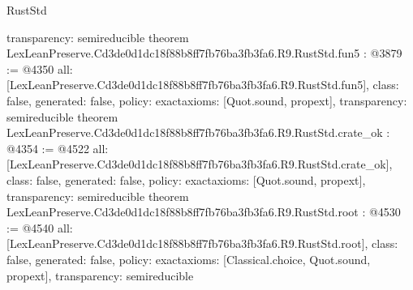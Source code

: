 \begin{lexlean}{RustStd}
\begin{coremodule}
{  transparency: semireducible
}
theorem LexLeanPreserve.Cd3de0d1dc18f88b8ff7fb76ba3fb3fa6.R9.RustStd.fun5 : @3879 := @4350 {
  all: [LexLeanPreserve.Cd3de0d1dc18f88b8ff7fb76ba3fb3fa6.R9.RustStd.fun5],
  class: false,
  generated: false,
  policy: exact{axioms: [Quot.sound, propext]},
  transparency: semireducible
}
theorem LexLeanPreserve.Cd3de0d1dc18f88b8ff7fb76ba3fb3fa6.R9.RustStd.crate_ok : @4354 := @4522 {
  all: [LexLeanPreserve.Cd3de0d1dc18f88b8ff7fb76ba3fb3fa6.R9.RustStd.crate_ok],
  class: false,
  generated: false,
  policy: exact{axioms: [Quot.sound, propext]},
  transparency: semireducible
}
theorem LexLeanPreserve.Cd3de0d1dc18f88b8ff7fb76ba3fb3fa6.R9.RustStd.root : @4530 := @4540 {
  all: [LexLeanPreserve.Cd3de0d1dc18f88b8ff7fb76ba3fb3fa6.R9.RustStd.root],
  class: false,
  generated: false,
  policy: exact{axioms: [Classical.choice, Quot.sound, propext]},
  transparency: semireducible
}


\end{coremodule}
\end{lexlean}
